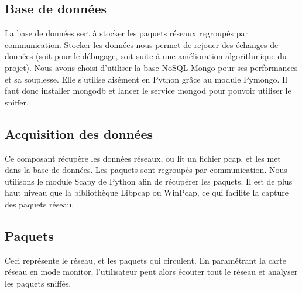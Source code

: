 \subsection{Base de données}
La base de données sert à stocker les paquets réseaux regroupés par communication. Stocker les données nous permet de rejouer des échanges de données (soit pour le débugage, soit suite à une amélioration algorithmique du projet).	
Nous avons choisi d'utiliser la base NoSQL Mongo pour ses performances et sa souplesse. Elle s'utilise aisément en Python grâce au module Pymongo. Il faut donc installer mongodb et lancer le service mongod pour pouvoir utiliser le sniffer.

\subsection{Acquisition des données}
Ce composant récupère les données réseaux, ou lit un fichier pcap, et les met dans la base de données. Les paquets sont regroupés par communication.
Nous utilisons le module Scapy de Python afin de récupérer les paquets. Il est de plus haut niveau que la bibliothèque Libpcap ou WinPcap, ce qui facilite la capture des paquets réseau. 

\subsection{Paquets}
Ceci représente le réseau, et les paquets qui circulent. En paramétrant la carte réseau en mode monitor, l'utilisateur peut alors écouter tout le réseau et analyser les paquets sniffés.


